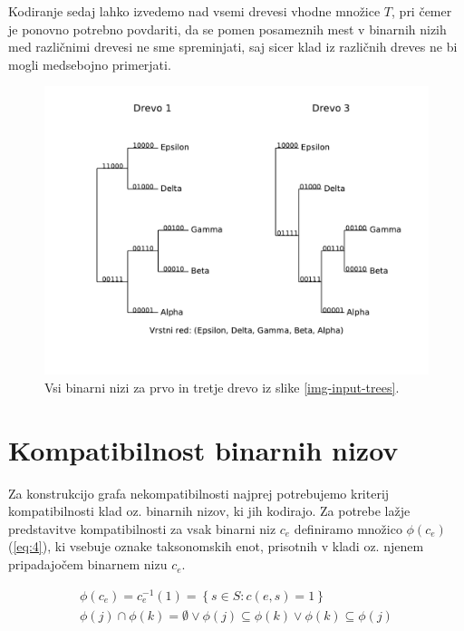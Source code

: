 \documentclass[a4paper, 12pt]{book}
\begin{document}
Kodiranje sedaj lahko izvedemo nad vsemi drevesi vhodne množice $T$, pri čemer je ponovno potrebno povdariti, da se pomen posameznih mest v binarnih nizih med različnimi drevesi ne sme spreminjati, saj sicer klad iz različnih dreves ne bi mogli medsebojno primerjati. 

\begin{figure}
	\begin{center}
		\includegraphics[scale=0.7, clip=true, trim=0 2cm 0 9mm]{gfx/bitstring_trees.pdf}
	\end{center}
	\caption{Vsi binarni nizi za prvo in tretje drevo iz slike \ref{img-input-trees}.}
	\label{img-bistring-trees-example}
\end{figure}

\section{Kompatibilnost binarnih nizov} 
Za konstrukcijo grafa nekompatibilnosti najprej potrebujemo kriterij kompatibilnosti klad oz. binarnih nizov, ki jih kodirajo. Za potrebe lažje predstavitve kompatibilnosti za vsak binarni niz $c_e$ definiramo množico $\phi(c_e)$ (\ref{eq:4}), ki vsebuje oznake taksonomskih enot, prisotnih v kladi oz. njenem pripadajočem binarnem nizu $c_e$. 

\begin{align}
	\phi(c_e) = c_e^{-1}(1) = \left\{ s \in S: c(e, s) = 1 \right\} \label{eq:4} \\
	\phi(j) \cap \phi(k) = \emptyset \lor \phi(j) \subseteq \phi(k) \lor \phi(k) \subseteq \phi(j) \label{eq:5}
\end{align} 
\end{document}
